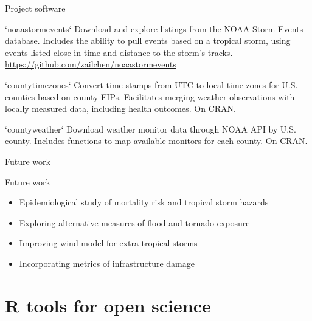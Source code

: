 \documentclass[ignorenonframetext,]{beamer}
\begin{document}
\begin{frame}{Project software}

\footnotesize

\begin{block}{`noaastormevents`}
Download and explore listings from the NOAA Storm Events database. Includes the ability to pull events based on a tropical storm, using events listed close in time and distance to the storm's tracks. 
\url{https://github.com/zailchen/noaastormevents}
\end{block}

\footnotesize

\begin{block}{`countytimezones`}
Convert time-stamps from UTC to local time zones for U.S. counties based on county FIPs. Facilitates merging weather observations with locally measured data, including health outcomes. On CRAN.
\end{block}

\footnotesize

\begin{block}{`countyweather`}
Download weather monitor data through NOAA API by U.S. county. Includes functions to map available monitors for each county. On CRAN.
\end{block}

\end{frame}

\begin{frame}{Future work}

\begin{block}{Future work}
\begin{itemize}
\item Epidemiological study of mortality risk and tropical storm hazards
\item Exploring alternative measures of flood and tornado exposure
\item Improving wind model for extra-tropical storms
\item Incorporating metrics of infrastructure damage
\end{itemize}
\end{block}

\end{frame}

\section{R tools for open science}\label{r-tools-for-open-science}
\end{document}
